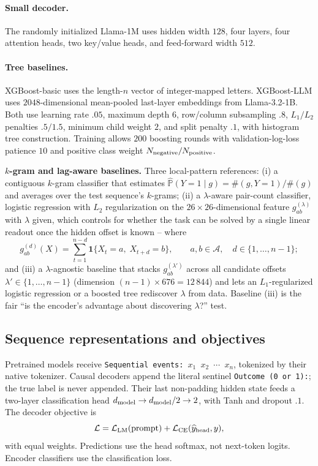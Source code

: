 \documentclass{article} %
\theoremstyle{plain}
\theoremstyle{definition}
\theoremstyle{remark}
\begin{document}
\paragraph{Small decoder.}
\label{app:tiny_llm_config}
The randomly initialized Llama-1M uses hidden width $128$, four layers,
four attention heads, two key/value heads, and feed-forward width $512$.

\paragraph{Tree baselines.}
\label{app:xgboost_settings}
XGBoost-basic uses the length-$n$ vector of integer-mapped letters.
XGBoost-LLM uses $2048$-dimensional mean-pooled last-layer embeddings from
Llama-3.2-1B. Both use learning rate $.05$, maximum depth $6$, row/column
subsampling $.8$, $L_1/L_2$ penalties $.5/1.5$, minimum child weight $2$,
and split penalty $.1$, with histogram tree construction. Training allows
$200$ boosting rounds with validation-log-loss patience $10$ and positive
class weight $N_{\rm negative}/N_{\rm positive}$.

\textbf{$k$-gram and lag-aware baselines.} Three local-pattern references: (i) a contiguous $k$-gram classifier that estimates $\hat{\mathbb{P}}(Y=1\mid g) = \#(g, Y=1)/\#(g)$ and averages over the test sequence's $k$-grams; (ii) a $\lambda$-aware pair-count classifier, logistic regression with $L_2$ regularization on the $26\!\times\!26$-dimensional feature $g_{ab}^{(\lambda)}$ with $\lambda$ given, which controls for whether the task can be solved by a single linear readout once the hidden offset is known -- where $$g_{ab}^{(d)}(X)=\sum_{t=1}^{n-d}\mathbf{1}\{X_t=a,\;X_{t+d}=b\},\qquad a,b\in\mathcal{A},\quad d\in\{1,\ldots,n-1\};$$ and (iii) a $\lambda$-agnostic baseline that stacks $g_{ab}^{(\lambda')}$ across all candidate offsets $\lambda' \in \{1, \ldots, n{-}1\}$ (dimension $(n{-}1)\!\times\! 676 = 12\,844$) and lets an $L_1$-regularized logistic regression or a boosted tree rediscover $\lambda$ from data. Baseline (iii) is the fair ``is the encoder's advantage about discovering $\lambda$?'' test.

\subsection{Sequence representations and objectives}
\label{subsec:encoding}

Pretrained models receive
\texttt{Sequential events: $x_1$ $x_2$ $\cdots$ $x_n$}, tokenized by
their native tokenizer. Causal decoders append the literal sentinel
\texttt{Outcome (0 or 1):}; the true label is never appended.
Their last non-padding hidden state feeds a two-layer classification head
$d_{\rm model}\to d_{\rm model}/2\to2$, with Tanh and dropout $.1$.
The decoder objective is
\[
\mathcal L=\mathcal L_{\rm LM}(\text{prompt})+
\mathcal L_{\rm CE}(\widehat y_{\rm head},y),
\]
with equal weights. Predictions use the head softmax, not next-token logits. Encoder classifiers use the classification loss. 
\end{document}
